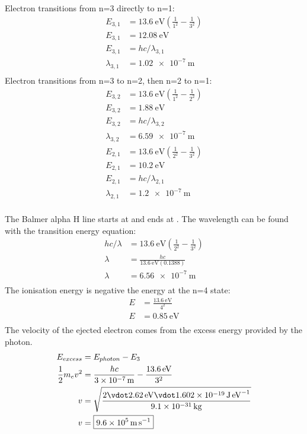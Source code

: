 \documentclass[newpage]{homework}
\begin{document}
\question
Electron transitions from n=3 directly to n=1:
\begin{align*}
	E_{3,1}	&=	\SI{13.6}{\electronvolt} \left(\frac{1}{1^2} - \frac{1}{3^2}\right)	\\
	E_{3,1}	&=	\boxed{\SI{12.08}{\electronvolt}}	\\
	E_{3,1}	&=	hc/\lambda_{3,1}	\\
	\lambda_{3,1}	&=	\boxed{\SI{1.02e-7}{\metre}}	\\
\end{align*}
Electron transitions from n=3 to n=2, then n=2 to n=1:
\begin{align*}
	E_{3,2}	&=	\SI{13.6}{\electronvolt} \left(\frac{1}{1^2} - \frac{1}{2^2}\right)	\\
	E_{3,2}	&=	\boxed{\SI{1.88}{\electronvolt}}	\\
	E_{3,2}	&=	hc/\lambda_{3,2}	\\
	\lambda_{3,2}	&=	\boxed{\SI{6.59e-7}{\metre}}	\\
	E_{2,1}	&=	\SI{13.6}{\electronvolt} \left(\frac{1}{2^2} - \frac{1}{3^2}\right)	\\
	E_{2,1}	&=	\boxed{\SI{10.2}{\electronvolt}}	\\
	E_{2,1}	&=	hc/\lambda_{2,1}	\\
	\lambda_{2,1}	&=	\boxed{\SI{1.2e-7}{\metre}}	\\
\end{align*}


\question
\begin{alphaparts}
	\questionpart The Balmer alpha H line starts at  and ends at .
	\questionpart The wavelength can be found with the transition energy equation:
	\begin{align*}
		hc/\lambda	&=	\SI{13.6}{\electronvolt} \left(\frac{1}{2^2} - \frac{1}{3^2}\right)	\\
		\lambda	&=	\frac{hc}{\SI{13.6}{\electronvolt} (0.1388)}	\\
		\lambda	&=	\boxed{\SI{6.56e-7}{\metre}}	\\
		\end{align*}
	\questionpart The ionisation energy is negative the energy at the n=4 state:
	\begin{align*}
		E	&=	\frac{\SI{13.6}{\electronvolt}}{4^2}	\\
		E	&=	\boxed{\SI{0.85}{\electronvolt}}	\\
	\end{align*}
	\questionpart The velocity of the ejected electron comes from the excess energy provided by the photon.
	\begin{align*}
		E_{excess}	&=	E_{photon} - E_3	\\
		\frac{1}{2} m_e v^2	&=	\frac{hc}{\SI{3e-7}{\metre}} - \frac{\SI{13.6}{\electronvolt}}{3^2}	\\
		v	&=	\sqrt{\frac{2 \vdot \SI{2.62}{\electronvolt} \vdot \SI{1.602e-19}{\joule\per\electronvolt}}{\SI{9.1e-31}{\kilogram}}}	\\
		v	&=	\boxed{\SI{9.6e5}{\metre\per\second}}	\\
	\end{align*}
\end{alphaparts}
\end{document}
